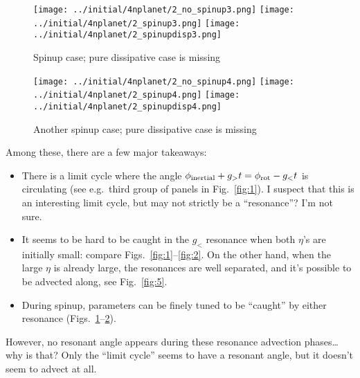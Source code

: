 \documentclass[11pt,
        usenames, %
        dvipsnames %
    ]{article}
\begin{document}
\begin{figure}
    \centering
    \texttt{[image: ../initial/4nplanet/2\_no\_spinup3.png]}
    \texttt{[image: ../initial/4nplanet/2\_spinup3.png]}
    \texttt{[image: ../initial/4nplanet/2\_spinupdisp3.png]}
    \caption{Spinup case; pure dissipative case is missing}\label{fig:3}
\end{figure}
\begin{figure}
    \centering
    \texttt{[image: ../initial/4nplanet/2\_no\_spinup4.png]}
    \texttt{[image: ../initial/4nplanet/2\_spinup4.png]}
    \texttt{[image: ../initial/4nplanet/2\_spinupdisp4.png]}
    \caption{Another spinup case; pure dissipative case is missing}\label{fig:4}
\end{figure}

Among these, there are a few major takeaways:
\begin{itemize}
    \item There is a limit cycle where the angle $\phi_{\rm inertial} + g_>t =
        \phi_{\rm rot} - g_<t$ is circulating (see e.g.\ third group of panels
        in Fig.~\ref{fig:1}). I suspect that this is an interesting limit cycle,
        but may not strictly be a ``resonance''? I'm not sure.

    \item It seems to be hard to be caught in the $g_<$ resonance when both
        $\eta$'s are initially small: compare Figs.~\ref{fig:1}--\ref{fig:2}. On
        the other hand, when the large $\eta$ is already large, the resonances
        are well separated, and it's possible to be advected along, see
        Fig.~\ref{fig:5}.

    \item During spinup, parameters can be finely tuned to be ``caught'' by
        either resonance (Figs.~\ref{fig:3}--\ref{fig:4}).
\end{itemize}
However, no resonant angle appears during these resonance advection phases\dots
why is that? Only the ``limit cycle'' seems to have a resonant angle, but it
doesn't seem to advect at all.
\end{document}
